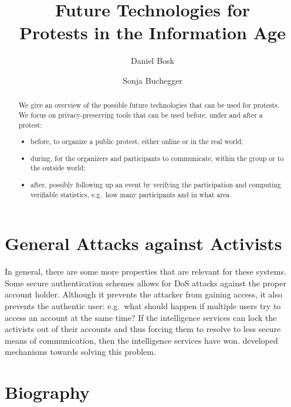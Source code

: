 \documentclass[a4paper]{llncs}
\title{%
  Future Technologies for\\
  Protests in the Information Age
}
\author{%
  Daniel Bosk
  \and
  Sonja Buchegger
}
\institute{%
  School of Computer Science and Communication,\\
  KTH Royal Institute of Technology,
  Stockholm\\
  \email{\{dbosk,buc\}@kth.se}
}
\begin{document}
\maketitle

\begin{abstract}
  We give an overview of the possible future technologies that can be used for 
  protests.
  We focus on privacy-preserving tools that can be used before, under and after 
  a protest:
  \begin{itemize}
    \item before, to organize a public protest, either online or in the real 
      world;
    \item during, for the organizers and participants to communicate, within 
      the group or to the outside world;
    \item after, possibly following up an event by verifying the participation 
      and computing verifiable statistics, e.g.\ how many participants and in 
      what area.
  \end{itemize}

\end{abstract}








\section{General Attacks against Activists}
\label{GeneralAttacks}

In general, there are some more properties that are relevant for these systems.
Some secure authentication schemes allows for \ac{DoS} attacks against the 
proper account holder.
Although it prevents the attacker from gaining access, it also prevents the 
authentic user:
e.g.\ what should happen if multiple users try to access an account at the same 
time?
If the intelligence services can lock the activists out of their accounts and 
thus forcing them to resolve to less secure means of communication, then the 
intelligence services have won.
\citet{P2PPasswords} developed mechanisms towards solving this problem.


\printbibliography{}


\appendix
\section{Biography}
\label{Biography}
\end{document}
